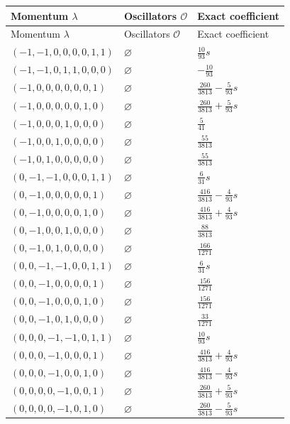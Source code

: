 \begingroup\scriptsize
\setlength{\tabcolsep}{5pt}
\begin{longtable}{@{}lll@{}}
\toprule
Momentum $\lambda$ & Oscillators $\mathcal O$ & Exact coefficient\\
\midrule\endfirsthead
\toprule
Momentum $\lambda$ & Oscillators $\mathcal O$ & Exact coefficient\\
\midrule\endhead
\bottomrule\endfoot
$(-1,-1,0,0,0,0,1,1)$ & $\varnothing$ & $\frac{10}{93}s$\\
$(-1,-1,0,1,1,0,0,0)$ & $\varnothing$ & $-\frac{10}{93}$\\
$(-1,0,0,0,0,0,0,1)$ & $\varnothing$ & $\frac{260}{3813}-\frac{5}{93}s$\\
$(-1,0,0,0,0,0,1,0)$ & $\varnothing$ & $\frac{260}{3813}+\frac{5}{93}s$\\
$(-1,0,0,0,1,0,0,0)$ & $\varnothing$ & $\frac{5}{41}$\\
$(-1,0,0,1,0,0,0,0)$ & $\varnothing$ & $\frac{55}{3813}$\\
$(-1,0,1,0,0,0,0,0)$ & $\varnothing$ & $\frac{55}{3813}$\\
$(0,-1,-1,0,0,0,1,1)$ & $\varnothing$ & $\frac{6}{31}s$\\
$(0,-1,0,0,0,0,0,1)$ & $\varnothing$ & $\frac{416}{3813}-\frac{4}{93}s$\\
$(0,-1,0,0,0,0,1,0)$ & $\varnothing$ & $\frac{416}{3813}+\frac{4}{93}s$\\
$(0,-1,0,0,1,0,0,0)$ & $\varnothing$ & $\frac{88}{3813}$\\
$(0,-1,0,1,0,0,0,0)$ & $\varnothing$ & $\frac{166}{1271}$\\
$(0,0,-1,-1,0,0,1,1)$ & $\varnothing$ & $\frac{6}{31}s$\\
$(0,0,-1,0,0,0,0,1)$ & $\varnothing$ & $\frac{156}{1271}$\\
$(0,0,-1,0,0,0,1,0)$ & $\varnothing$ & $\frac{156}{1271}$\\
$(0,0,-1,0,1,0,0,0)$ & $\varnothing$ & $\frac{33}{1271}$\\
$(0,0,0,-1,-1,0,1,1)$ & $\varnothing$ & $\frac{10}{93}s$\\
$(0,0,0,-1,0,0,0,1)$ & $\varnothing$ & $\frac{416}{3813}+\frac{4}{93}s$\\
$(0,0,0,-1,0,0,1,0)$ & $\varnothing$ & $\frac{416}{3813}-\frac{4}{93}s$\\
$(0,0,0,0,-1,0,0,1)$ & $\varnothing$ & $\frac{260}{3813}+\frac{5}{93}s$\\
$(0,0,0,0,-1,0,1,0)$ & $\varnothing$ & $\frac{260}{3813}-\frac{5}{93}s$\\

\end{longtable}
